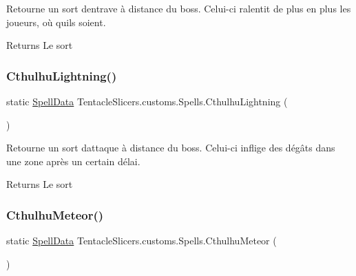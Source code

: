 Retourne un sort d\textquotesingle{}entrave à distance du boss. Celui-\/ci ralentit de plus en plus les joueurs, où qu\textquotesingle{}ils soient. 

\begin{DoxyReturn}{Returns}
Le sort 
\end{DoxyReturn}
\mbox{\label{class_tentacle_slicers_1_1customs_1_1_spells_ac53a8734a12767f86c977c48f7ac7c7f}} 
\subsubsection{\texorpdfstring{Cthulhu\+Lightning()}{CthulhuLightning()}}
{\footnotesize\ttfamily static \hyperlink{class_tentacle_slicers_1_1spells_1_1_spell_data}{Spell\+Data} Tentacle\+Slicers.\+customs.\+Spells.\+Cthulhu\+Lightning (\begin{DoxyParamCaption}{ }\end{DoxyParamCaption})\hspace{0.3cm}{\ttfamily [static]}}



Retourne un sort d\textquotesingle{}attaque à distance du boss. Celui-\/ci inflige des dégâts dans une zone après un certain délai. 

\begin{DoxyReturn}{Returns}
Le sort 
\end{DoxyReturn}
\mbox{\label{class_tentacle_slicers_1_1customs_1_1_spells_aa7ab3b9198afe02928388f6e7a894508}} 
\subsubsection{\texorpdfstring{Cthulhu\+Meteor()}{CthulhuMeteor()}}
{\footnotesize\ttfamily static \hyperlink{class_tentacle_slicers_1_1spells_1_1_spell_data}{Spell\+Data} Tentacle\+Slicers.\+customs.\+Spells.\+Cthulhu\+Meteor (\begin{DoxyParamCaption}{ }\end{DoxyParamCaption})\hspace{0.3cm}{\ttfamily [static]}}




